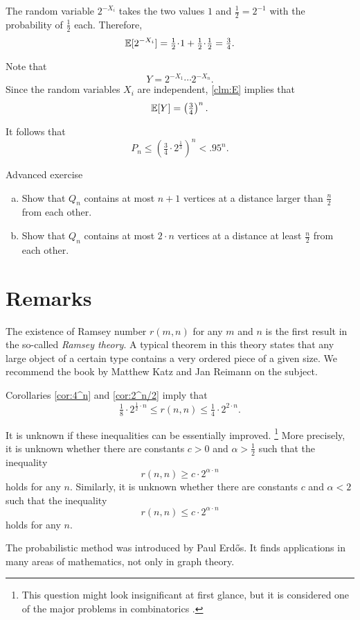 The random variable $2^{-X_i}$ takes the two values $1$ and $\tfrac12=2^{-1}$ with the probability of $\tfrac12$ each.
Therefore, 
\[\EE[2^{-X_i}]=\tfrac12\cdot 1+\tfrac12\cdot\tfrac12=\tfrac 34.\]

Note that 
\[Y=2^{-X_1}\cdots 2^{-X_n}.\]
Since the random variables $X_i$ are independent, \ref{clm:E} implies that
\[\mathbb{E}[Y]=\left(\tfrac34\right)^n.\]

It follows that 
\[P_n\le \left(\tfrac34\cdot 2^{\frac13}\right)^n< .95^n.\]
\qedsf

\begin{thm}{Advanced exercise}\label{ex:lin-Qn}
\begin{enumerate}[(a)]
\item \label{ex:lin-Qn:n+1} Show that $Q_n$ contains at most $n+1$ vertices at a distance larger than $\tfrac n2$ from each other.
\item \label{ex:lin-Qn:2n} Show that $Q_n$ contains at most $2\cdot n$ vertices at a distance at least $\tfrac n2$ from each other.
\end{enumerate}
\end{thm}
 

\section{Remarks}

The existence of Ramsey number $r(m,n)$ for any $m$ and $n$ is the first result in the so-called \textit{Ramsey theory}. 
A typical theorem in this theory states that any large object of a certain type contains a very ordered piece of a given size.
We recommend the book by Matthew Katz and Jan Reimann \cite{katz-reimann} on the subject. 

Corollaries \ref{cor:4^n} and \ref{cor:2^n/2} imply that 
\[\tfrac18\cdot 2^{\frac12\cdot n}\le r(n,n)\le \tfrac14\cdot 2^{2\cdot n}.\]

It is unknown if these inequalities can be essentially improved.%
\footnote{This question might look insignificant at first glance, but it is considered one of the major problems in combinatorics \cite{gowers}.}
More precisely, it is unknown whether there are constants $c>0$ and $\alpha>\tfrac12$ such that the inequality
\[r(n,n)\ge c\cdot 2^{\alpha\cdot n}\]
holds for any $n$.
Similarly, it is unknown whether there are constants $c$ and $\alpha<2$ such that the inequality
\[r(n,n)\le c\cdot 2^{\alpha\cdot n}\]
holds for any $n$.

The probabilistic method was introduced by Paul Erd\H os.
It finds applications in many areas of mathematics, not only in graph theory.

